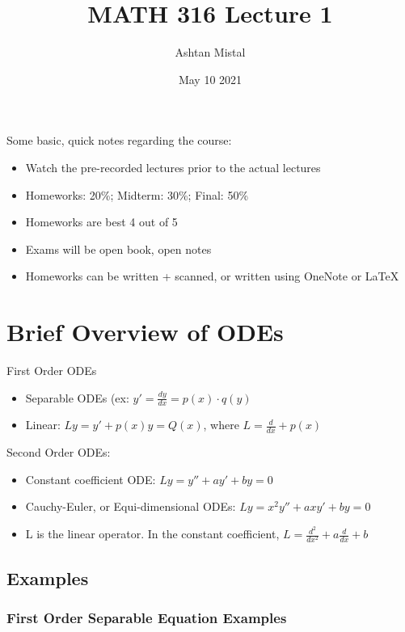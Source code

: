 \documentclass{article}
\title{MATH 316 Lecture 1}
\author{Ashtan Mistal}
\date{May 10 2021}
\begin{document}
\ifstandalone
\maketitle
\fi

\graphicspath{{./Lecture01/}}

Some basic, quick notes regarding the course:

\begin{itemize}
    \item Watch the pre-recorded lectures prior to the actual lectures
    \item Homeworks: 20\%; Midterm: 30\%; Final: 50\%
    \item Homeworks are best 4 out of 5
    \item Exams will be open book, open notes
    \item Homeworks can be written + scanned, or written using OneNote or \LaTeX
\end{itemize}

\section{Brief Overview of ODEs}

First Order ODEs

\begin{itemize}
    \item Separable ODEs (ex: $y' = \frac{dy}{dx} = p(x) \cdot q(y)$
    \item Linear: $Ly = y' + p(x) y = Q(x)$, where $L = \frac{d}{dx} + p(x)$
\end{itemize}

Second Order ODEs:

\begin{itemize}
    \item Constant coefficient ODE: $Ly = y'' + a y' + by = 0$
    \item Cauchy-Euler, or Equi-dimensional ODEs: $Ly = x^2 y'' + a x y' + by = 0$
    \item L is the linear operator. In the constant coefficient, $L = \frac{d^2}{dx^2} + a \frac{d}{dx} + b$ 
\end{itemize}

\subsection{Examples}
\subsubsection{First Order Separable Equation Examples}
\end{document}
